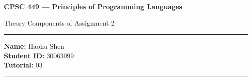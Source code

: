 \documentclass[11pt]{article}
\theoremstyle{definition}
\begin{document}
\begin{center}
{\bf \Large CPSC 449 --- Principles of Programming Languages

Theory Components of Assignment 2}
\end{center}

\newenvironment{titlemize}[1]{%
  \paragraph{#1}
  \begin{itemize}}
  {\end{itemize}}
  
\hrule 	

\textbf{Name:} Haohu Shen \\
\textbf{Student ID:} 30063099 \\
\textbf{Tutorial:} 03 

\medskip \hrule
\end{document}
